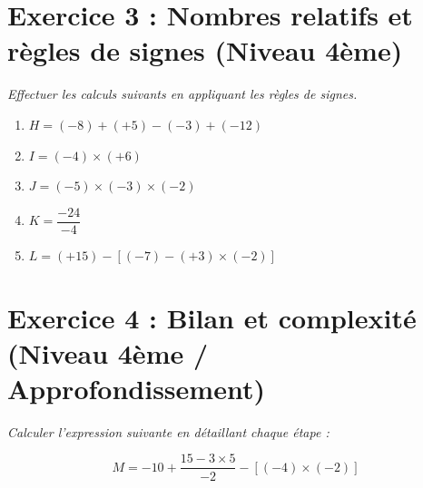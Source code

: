 \documentclass[a4paper,12pt]{article}
\begin{document}
\vspace{1cm}

\section*{Exercice 3 : Nombres relatifs et règles de signes (Niveau 4ème)}
\textit{Effectuer les calculs suivants en appliquant les règles de signes.}

\begin{enumerate}
    \item $H = (-8) + (+5) - (-3) + (-12)$
    \item $I = (-4) \times (+6)$
    \item $J = (-5) \times (-3) \times (-2)$
    \item $K = \dfrac{-24}{-4}$
    \item $L = (+15) - [(-7) - (+3) \times (-2)]$
\end{enumerate}

\vspace{1cm}

\section*{Exercice 4 : Bilan et complexité (Niveau 4ème / Approfondissement)}
\textit{Calculer l'expression suivante en détaillant chaque étape :}

$$M = -10 + \frac{15 - 3 \times 5}{-2} - [(-4) \times (-2)]$$
\end{document}
